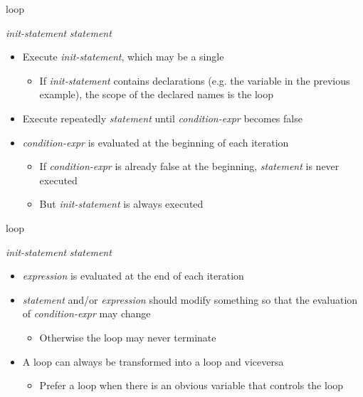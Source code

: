 \begin{frame}[fragile]{ loop}

   \textit{init-statement}  \code{;}
   \code{)} \textit{statement}

  \pause

  \begin{itemize}[<+->]
  \item Execute \textit{init-statement}, which may be a single \code{;}
    \begin{itemize}
    \item If \textit{init-statement} contains declarations (e.g. the 
      variable in the previous example), the scope of the declared names is
      the loop
    \end{itemize}
  \item Execute repeatedly \textit{statement} until \textit{condition-expr} becomes false
  \item \textit{condition-expr} is evaluated at the beginning of each iteration
    \begin{itemize}
    \item If \textit{condition-expr} is already false at the beginning,
      \textit{statement} is never executed
    \item But \textit{init-statement} is always executed
    \end{itemize}
  \end{itemize}

\end{frame}

\begin{frame}[fragile]{ loop \insertcontinuationtext}

   \textit{init-statement}  \code{;}
   \code{)} \textit{statement}

  \pause

  \begin{itemize}[<+->]
  \item \textit{expression} is evaluated at the end of each iteration
  \item \textit{statement} and/or \textit{expression} should modify something so
    that the evaluation of \textit{condition-expr} may change
    \begin{itemize}[<.->]
    \item Otherwise the loop may never terminate
    \end{itemize}
  \item A  loop can always be transformed into a  loop and
    viceversa
    \begin{itemize}
    \item Prefer a  loop when there is an obvious variable that
      controls the loop
    \end{itemize}
  \end{itemize}
\end{frame}

